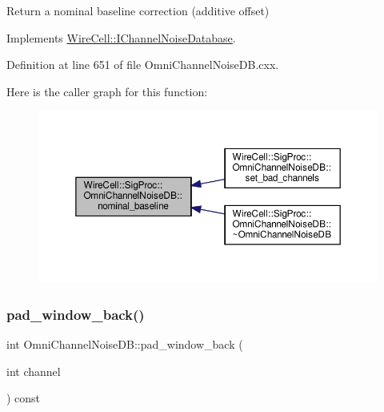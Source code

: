Return a nominal baseline correction (additive offset) 



Implements \hyperlink{class_wire_cell_1_1_i_channel_noise_database_a253f602c70bddb7986e63dc14b8d8e6e}{Wire\+Cell\+::\+I\+Channel\+Noise\+Database}.



Definition at line 651 of file Omni\+Channel\+Noise\+D\+B.\+cxx.

Here is the caller graph for this function\+:
\nopagebreak
\begin{figure}[H]
\begin{center}
\leavevmode
\includegraphics[width=350pt]{class_wire_cell_1_1_sig_proc_1_1_omni_channel_noise_d_b_a7d762e341143dea15eb2d8f57aac9c86_icgraph}
\end{center}
\end{figure}
\mbox{\label{class_wire_cell_1_1_sig_proc_1_1_omni_channel_noise_d_b_ac765001725b5a181ccfd605d0221e0ef}} 
\subsubsection{\texorpdfstring{pad\+\_\+window\+\_\+back()}{pad\_window\_back()}}
{\footnotesize\ttfamily int Omni\+Channel\+Noise\+D\+B\+::pad\+\_\+window\+\_\+back (\begin{DoxyParamCaption}\item[{int}]{channel }\end{DoxyParamCaption}) const\hspace{0.3cm}{\ttfamily [virtual]}}



